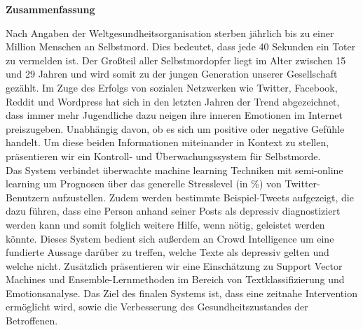 
\clearemptydoublepage

\vspace*{2cm}
\begin{center}
{\Large \bf Zusammenfassung}
\end{center}
\vspace{1cm}

Nach Angaben der Weltgesundheitsorganisation sterben j\"ahrlich bis zu einer Million Menschen an Selbstmord. Dies bedeutet, dass jede 40 Sekunden ein Toter zu vermelden ist. Der Gro{\ss}teil aller Selbstmordopfer liegt im Alter zwischen 15 und 29 Jahren und wird somit zu der jungen Generation unserer Gesellschaft gez\"ahlt. Im Zuge des Erfolgs von sozialen Netzwerken wie Twitter, Facebook, Reddit und Wordpress hat sich in den letzten Jahren der Trend abgezeichnet, dass immer mehr Jugendliche dazu neigen ihre inneren Emotionen im Internet preiszugeben. Unabh\"angig davon, ob es sich um positive oder negative Gef\"uhle handelt. Um diese beiden Informationen miteinander in Kontext zu stellen, pr\"asentieren wir ein Kontroll- und \"Uberwachungssystem f\"ur Selbstmorde.\\

Das System verbindet \"uberwachte machine learning Techniken mit semi-online learning um Prognosen \"uber das generelle Stresslevel (in \%) von Twitter-Benutzern aufzustellen. Zudem werden bestimmte Beispiel-Tweets aufgezeigt, die dazu f\"uhren, dass eine Person anhand seiner Posts als depressiv diagnostiziert werden kann und somit folglich weitere Hilfe, wenn n\"otig, geleistet werden k\"onnte. Dieses System bedient sich au{\ss}erdem an Crowd Intelligence um eine fundierte Aussage dar\"uber zu treffen, welche Texte als depressiv gelten und welche nicht. Zus\"atzlich pr\"asentieren wir eine Einsch\"atzung zu Support Vector Machines und Ensemble-Lernmethoden im Bereich von Textklassifizierung und Emotionsanalyse. Das Ziel des finalen Systems ist, dass eine zeitnahe Intervention erm\"oglicht wird, sowie die Verbesserung des Gesundheitszustandes der Betroffenen.
